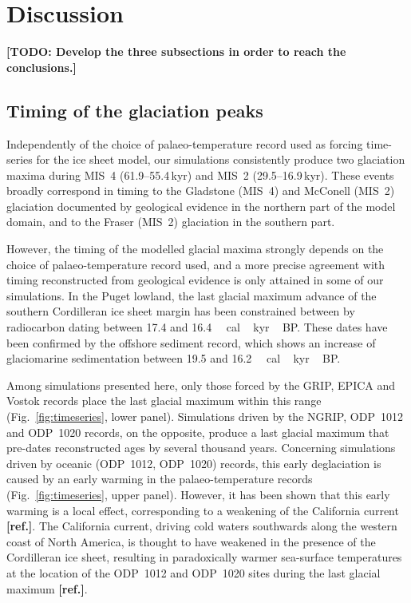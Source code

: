 \documentclass[tc, ms]{copernicus}
\newcommand{\todo}[1]{\textbf{[TODO: #1]}}
\newcommand{\aref}[0]{\textbf{[ref.]}}
\begin{document}
\section{Discussion}
\label{sec:discussion}

\todo{Develop the three subsections in order to reach the conclusions.}

\subsection{Timing of the glaciation peaks}

Independently of the choice of palaeo-temperature record used as forcing
time-series for the ice sheet model, our simulations consistently produce two
glaciation maxima during MIS~4 (61.9--55.4\,\unit{kyr}) and MIS~2
(29.5--16.9\,\unit{kyr}). These events broadly correspond in timing to the
Gladstone (MIS~4) and McConell (MIS~2) glaciation documented by geological
evidence in the northern part of the model domain, and to the Fraser (MIS~2)
glaciation in the southern part.

However, the timing of the modelled glacial maxima strongly depends on the
choice of palaeo-temperature record used, and a more precise agreement with
timing reconstructed from geological evidence is only attained in some of our
simulations. In the Puget lowland, the last glacial maximum advance of the
southern Cordilleran ice sheet margin has been constrained between by
radiocarbon dating between 17.4 and 16.4\,\unit{\,cal\,kyr\,BP}.
These dates have been confirmed by the offshore sediment record, which shows an
increase of glaciomarine sedimentation between 19.5 and
16.2\,\unit{\,cal\,kyr\,BP}.

Among simulations presented here, only those forced by the GRIP, EPICA and
Vostok records place the last glacial maximum within this range
(Fig.~\ref{fig:timeseries}, lower panel). Simulations driven by the NGRIP,
ODP~1012 and ODP~1020 records, on the opposite, produce a last glacial maximum
that pre-dates reconstructed ages by several thousand years. Concerning
simulations driven by oceanic (ODP~1012, ODP~1020) records, this early
deglaciation is caused by an early warming in the palaeo-temperature records
(Fig.~\ref{fig:timeseries}, upper panel). However, it has been shown that this
early warming is a local effect, corresponding to a weakening of the California
current \aref. The California current, driving cold waters southwards
along the western coast of North America, is thought to have weakened in the
presence of the Cordilleran ice sheet, resulting in paradoxically warmer
sea-surface temperatures at the location of the ODP~1012 and ODP~1020 sites
during the last glacial maximum \aref.
\end{document}
